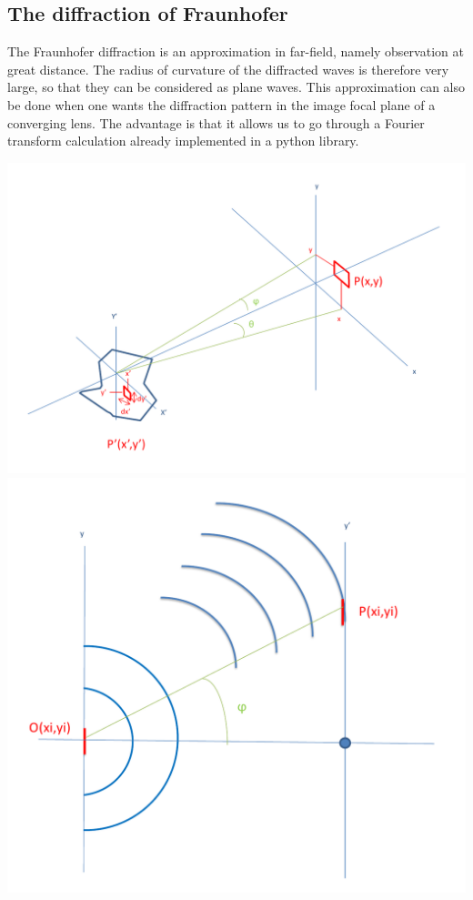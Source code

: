 \documentclass[10pt,a4paper]{article}
\begin{document}
	\subsection{The diffraction of Fraunhofer}
The Fraunhofer diffraction is an approximation in far-field, namely observation at great distance. The radius of curvature of the diffracted waves is therefore very large, so that they can be considered as plane waves. This approximation can also be done when one wants the diffraction pattern in the image focal plane of a converging lens. The advantage is that it allows us to go through a Fourier transform calculation already implemented in a python library.

\begin{center}
\includegraphics[scale=0.32]{../Ressources/schema-1-crop.png}
\includegraphics[scale=0.32]{../Ressources/schema-2-crop.png}
\end{center}
\end{document}

